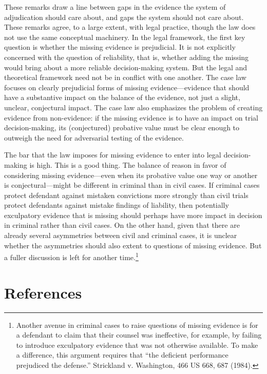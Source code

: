 \documentclass[
  10pt,
  dvipsnames,enabledeprecatedfontcommands]{scrartcl}
\begin{document}
These remarks draw a line between gaps in the evidence the system of
adjudication should care about, and gaps the system should not care
about. These remarks agree, to a large extent, with legal practice,
though the law does not use the same conceptual machinery. In the legal
framework, the first key question is whether the missing evidence is
prejudicial. It is not explicitly concerned with the question of
reliability, that is, whether adding the missing would bring about a
more reliable decision-making system. But the legal and theoretical
framework need not be in conflict with one another. The case law focuses
on clearly prejudicial forms of missing evidence---evidence that should
have a substantive impact on the balance of the evidence, not just a
slight, unclear, conjectural impact. The case law also emphasizes the
problem of creating evidence from non-evidence: if the missing evidence
is to have an impact on trial decision-making, its (conjectured)
probative value must be clear enough to outweigh the need for
adversarial testing of the evidence.

The bar that the law imposes for missing evidence to enter into legal
decision-making is high. This is a good thing. The balance of reason in
favor of considering missing evidence---even when its probative value
one way or another is conjectural---might be different in criminal than
in civil cases. If criminal cases protect defendant against mistaken
convictions more strongly than civil trials protect defendants against
mistake findings of liability, then potentially exculpatory evidence
that is missing should perhaps have more impact in decision in criminal
rather than civil cases. On the other hand, given that there are already
several asymmetries between civil and criminal cases, it is unclear
whether the asymmetries should also extent to questions of missing
evidence. But a fuller discussion is left for another time.\footnote{Another
  avenue in criminal cases to raise questions of missing evidence is for
  a defendant to claim that their counsel was ineffective, for example,
  by failing to introduce exculpatory evidence that was not otherwise
  available. To make a difference, this argument requires that ``the
  deficient performance prejudiced the defense.'' Strickland v.
  Washington, 466 US 668, 687 (1984).}

\hypertarget{references}{%
\section*{References}\label{references}}
\end{document}
